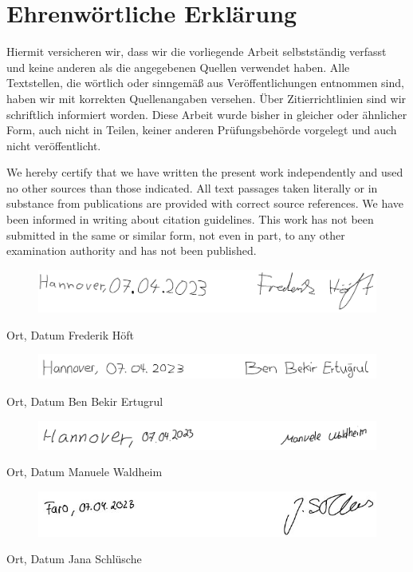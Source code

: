 \chapter*{Ehrenwörtliche Erklärung}

Hiermit versicheren wir, dass wir die vorliegende Arbeit selbstständig verfasst und keine anderen als die angegebenen Quellen verwendet haben. Alle Textstellen, die wörtlich oder sinngemäß aus Veröffentlichungen entnommen sind, haben wir mit korrekten Quellenangaben versehen. Über Zitierrichtlinien sind wir schriftlich informiert worden. Diese Arbeit wurde bisher in gleicher oder ähnlicher Form, auch nicht in Teilen, keiner anderen Prüfungsbehörde vorgelegt und auch nicht veröffentlicht.

\vspace{1cm}
\hspace{-.6cm}{\normalfont\Huge\bfseries Declaration of Authorship}
\vspace{0.75cm}

\hspace{-.6cm}We hereby certify that we have written the present work independently and used no other sources than those indicated. All text passages taken literally or in substance from publications are provided with correct source references. We have been informed in writing about citation guidelines. This work has not been submitted in the same or similar form, not even in part, to any other examination authority and has not been published.
\vspace{.5cm}

\begin{figure}[H]
    \includegraphics[width=\linewidth]{images/UnterschriftFreddy}
\end{figure}
Ort, Datum \hfill Frederik Höft \hspace{1cm}

\begin{figure}[H]
    \includegraphics[width=\linewidth]{images/UnterschriftBen.png}
\end{figure}
Ort, Datum \hfill Ben Bekir Ertugrul \hspace{1cm}

\begin{figure}[H]
    \includegraphics[width=\linewidth]{images/UnerschriftManu.png}
\end{figure}
Ort, Datum \hfill Manuele Waldheim \hspace{1cm}

\begin{figure}[H]
    \includegraphics[width=\linewidth]{images/Unterschrift.JPG}
\end{figure}
Ort, Datum \hfill Jana Schlüsche \hspace{1cm}
